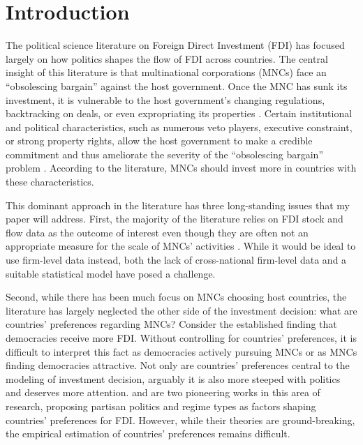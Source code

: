 \section{Introduction}
\label{sec:introduction}

The political science literature on Foreign Direct Investment (FDI) has focused largely on how politics shapes the flow of FDI across countries. The central insight of this literature is that multinational corporations (MNCs) face an ``obsolescing bargain'' against the host government. Once the MNC has sunk its investment, it is vulnerable to the host government's changing regulations, backtracking on deals, or even expropriating its properties \citep{Li2009a, Sawant2010}. Certain institutional and political characteristics, such as numerous veto players, executive constraint, or strong property rights, allow the host government to make a credible commitment and thus ameliorate the severity of the ``obsolescing bargain'' problem \citep{Busse2007, Jensen2014, Li2003}. According to the literature, MNCs should invest more in countries with these characteristics.

This dominant approach in the literature has three long-standing issues that my paper will address. First, the majority of the literature relies on FDI stock and flow data as the outcome of interest even though they are often not an appropriate measure for the scale of MNCs' activities \citep{Kerner2014}. While it would be ideal to use firm-level data instead, both the lack of cross-national firm-level data and a suitable statistical model have posed a challenge.

Second, while there has been much focus on MNCs choosing host countries, the literature has largely neglected the other side of the investment decision: what are countries' preferences regarding MNCs? Consider the established finding that democracies receive more FDI. Without controlling for countries' preferences, it is difficult to interpret this fact as democracies actively pursuing MNCs or as MNCs finding democracies attractive. Not only are countries' preferences central to the modeling of investment decision, arguably it is also more steeped with politics and deserves more attention. \citet{Pinto2013} and \citet{Pandya2016} are two pioneering works in this area of research, proposing partisan politics and regime types as factors shaping countries' preferences for FDI. However, while their theories are ground-breaking, the empirical estimation of countries' preferences remains difficult.

